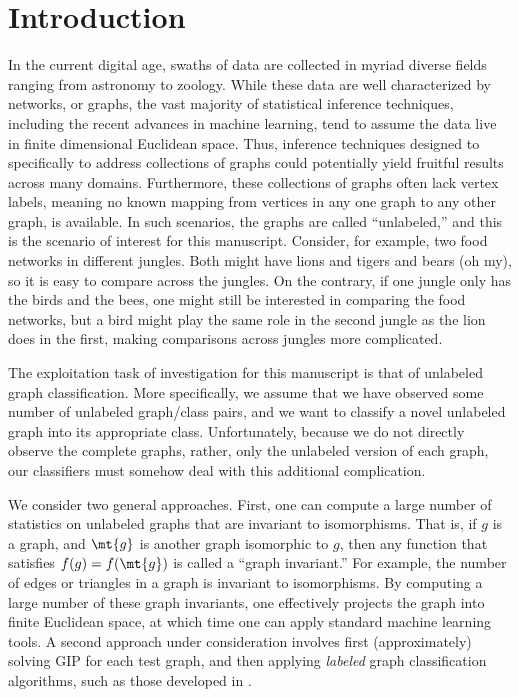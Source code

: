 \section{Introduction}

In the current digital age, swaths of data are collected in myriad diverse fields ranging from astronomy to zoology.  While these data are well characterized by networks, or graphs, the vast majority of statistical inference techniques, including the recent advances in machine learning, tend to assume the data live in finite dimensional Euclidean space.  Thus, inference techniques designed to specifically to address collections of graphs could potentially yield fruitful results across many domains.  Furthermore, these collections of graphs often lack vertex labels, meaning no known mapping from vertices in any one graph to any other graph, is available.  In such scenarios, the graphs are called ``unlabeled,'' and this is the scenario of interest for this manuscript.  Consider, for example, two food networks in different jungles.  Both might have lions and tigers and bears (oh my), so it is easy to compare across the jungles.  On the contrary, if one jungle only has the birds and the bees, one might still be interested in comparing the food networks, but a bird might play the same role in the second jungle as the lion does in the first, making comparisons across jungles more complicated.



The exploitation task of investigation for this manuscript is that of unlabeled graph classification.  More specifically, we assume that we have observed some number of unlabeled graph/class pairs, and we want to classify a novel unlabeled graph into its appropriate class. Unfortunately, because we do not directly observe the complete graphs, rather, only the unlabeled version of each graph, our classifiers must somehow deal with this additional complication.

We consider two general approaches.  First, one can compute a large number of statistics on unlabeled graphs that are invariant to isomorphisms.  That is, if $g$ is a graph, and $\mt{g}$ is another graph isomorphic to $g$, then any function that satisfies $f(g)=f(\mt{g})$ is called a ``graph invariant.''  For example, the number of edges or triangles in a graph is invariant to isomorphisms.  By computing a large number of these graph invariants, one effectively projects the graph into finite Euclidean space, at which time one can apply standard machine learning tools.  A second approach under consideration involves first (approximately) solving GIP for each test graph, and then applying \emph{labeled} graph classification algorithms, such as those developed in \cite{??}.


